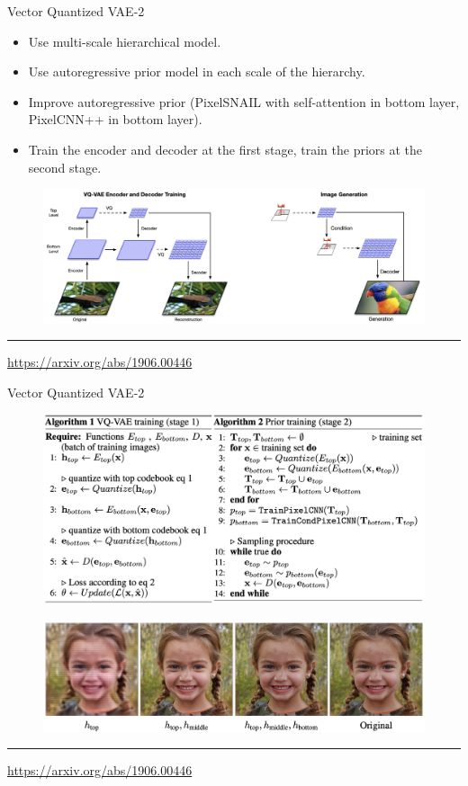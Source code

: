 \documentclass{beamer}
\begin{document}
\begin{frame}{Vector Quantized VAE-2}
	\begin{itemize}
		\item Use multi-scale hierarchical model.
		\item Use autoregressive prior model in each scale of the hierarchy.
		\item Improve autoregressive prior (PixelSNAIL with self-attention in bottom layer, PixelCNN++ in bottom layer).
		\item Train the encoder and decoder at the first stage, train the priors at the second stage.
	\end{itemize}
	\begin{figure}
		\centering
		\includegraphics[width=\linewidth]{figs/vqvae2}
	\end{figure}
	\vfill
	\hrule\medskip
	{\scriptsize \href{https://arxiv.org/abs/1906.00446}{https://arxiv.org/abs/1906.00446}} 
\end{frame}
\begin{frame}{Vector Quantized VAE-2}
		\begin{figure}
			\centering
			\includegraphics[width=0.9\linewidth]{figs/vqvae2_pseudo}
		\end{figure}
		\begin{figure}
			\centering
			\includegraphics[width=0.85\linewidth]{figs/vqvae2_latents}
		\end{figure}
	\vfill
	\hrule\medskip
	{\scriptsize \href{https://arxiv.org/abs/1906.00446}{https://arxiv.org/abs/1906.00446}} 
\end{frame}
\end{document}
